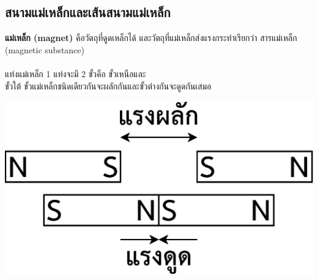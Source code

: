 \subsection{สนามแม่เหล็กและเส้นสนามแม่เหล็ก}
\begin{minipage}{.5\textwidth}
\textbf{แม่เหล็ก (magnet)}  คือวัตถุที่ดูดเหล็กได้ และวัตถุที่แม่เหล็กส่งแรงกระทำเรียกว่า {\color{red} สารแม่เหล็ก (magnetic  substance)} 
\\\\
แท่งแม่เหล็ก 1 แท่งจะมี  2  ขั้วคือ \hfill ขั้วเหนือและ \\ ขั้วใต้ ขั้วแม่เหล็กชนิดเดียวกันจะผลักกันและขั้วต่างกันจะดูดกันเสมอ
\end{minipage} \hfill
\begin{adjustbox}{valign=c} 
    \begin{minipage}[c]{.45\linewidth}
        \includegraphics[width=\linewidth]{lesson2-1-1.eps}
    \end{minipage}
\end{adjustbox}

\tcblower

